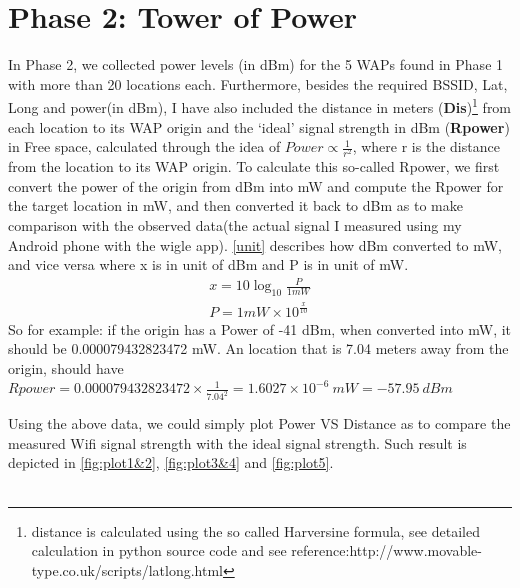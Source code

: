 \documentclass[usletter,12pt]{article}
\begin{document}
\section{Phase 2: Tower of Power}
In Phase 2, we collected power levels (in dBm) for the 5 WAPs found in Phase 1 with more than 20 locations each. Furthermore, besides the required BSSID, Lat, Long and power(in dBm), I have also included the distance in meters (\textbf{Dis})\footnote{distance is calculated using the so called Harversine formula, see detailed calculation in python source code and see reference:http://www.movable-type.co.uk/scripts/latlong.html} from each location to its WAP origin and the `ideal' signal strength in dBm (\textbf{Rpower}) in Free space, calculated through the idea of $Power \propto \frac{1}{r^2}$, where r is the distance from the location to its WAP origin. To calculate this so-called Rpower, we first convert the power of the origin from dBm into mW and compute the Rpower for the target location in mW, and then converted it back to dBm as to make comparison with the observed data(the actual signal I measured using my Android phone with the wigle app). \autoref{unit} describes how dBm converted to mW, and vice versa where x is in unit of dBm and P is in unit of mW.
\begin{eqnarray}
x = 10\log_{10} \frac{P}{1 mW} \nonumber \\
P = 1mW \times 10^{\frac{x}{10}}
\label{unit}
\end{eqnarray}
So for example: if the origin has a Power of -41 dBm, when converted into mW, it should be 0.000079432823472 mW. An location that is 7.04 meters away from the origin, should have $Rpower =  0.000079432823472 \times \frac{1}{7.04^2} = 1.6027\times10^{-6}\ mW = -57.95\ dBm$





Using the above data, we could simply plot Power VS Distance as to compare the measured Wifi signal strength with the ideal signal strength. Such result is depicted in
\autoref{fig:plot1&2}, \autoref{fig:plot3&4} and \autoref{fig:plot5}.\\\\
\end{document}
